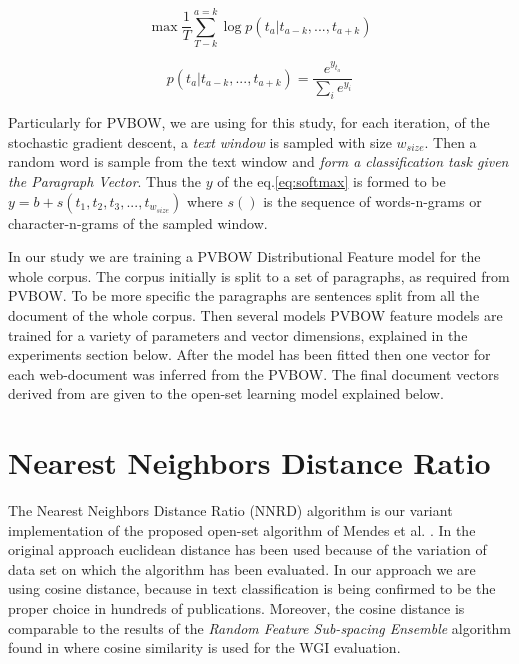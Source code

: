 \documentclass[runningheads]{llncs}
\begin{document}
\begin{equation} \label{eq:objFN}
    \max{\frac{1}{T} \sum^{a=k}_{T-k}{\log{p(t_{a}|t_{a-k},...,t_{a+k})}}}
\end{equation}

\begin{equation} \label{eq:softmax}
    p(t_{a}|t_{a-k},...,t_{a+k}) = \frac{e^{y_{t_{a}}}}{\sum_{i}{e^{y_i}}}
\end{equation}

Particularly for PVBOW, we are using for this study, for each iteration, of the stochastic gradient descent, a \textit{text window} is sampled with size $w_{size}$. Then a random word is sample from the text window and \textit{form a classification task given the Paragraph Vector}. Thus the $y$ of the eq.\ref{eq:softmax} is formed to be $y = b + s(t_{1},t_{2},t_{3},...,t_{w_{size}})$ where $s()$ is the sequence of words-n-grams or character-n-grams of the sampled window.

In our study we are training a PVBOW Distributional Feature model for the whole corpus. The corpus initially is split to a set of paragraphs, as required from PVBOW. To be more specific the paragraphs are sentences split from all the document of the whole corpus. Then several models PVBOW feature models are trained for a variety of parameters and vector dimensions, explained in the experiments section below. After the model has been fitted then one vector for each web-document was inferred from the PVBOW. The final document vectors derived from  are given to the open-set learning model explained below.

\section{Nearest Neighbors Distance Ratio}\label{sec:NNRD_Description}

The Nearest Neighbors Distance Ratio (NNRD) algorithm is our variant implementation of the proposed open-set algorithm of Mendes et al. \cite{mendesjunior2016}. In the original approach euclidean distance has been used because of the variation of data set on which the algorithm has been evaluated. In our approach we are using cosine distance, because in text classification is being confirmed to be the proper choice in hundreds of publications. Moreover, the cosine distance is comparable to the results of the \textit{Random Feature Sub-spacing Ensemble} algorithm found in \cite{pritsos2018open} where cosine similarity is used for the WGI evaluation.
\end{document}
